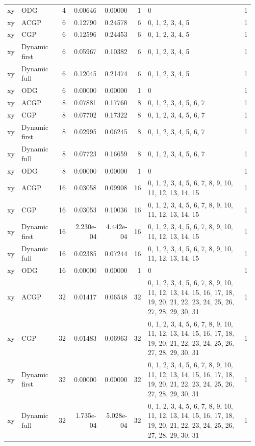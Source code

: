 \documentclass[10pt,a4paper]{article}
\begin{document}
\begin{longtable}{@{}p{23mm}p{29mm}rrrrp{36mm}r@{}}
xy & ODG & 4 & 0.00646 & 0.00000 & 1 & 0 & 1 \\
xy & ACGP & 6 & 0.12790 & 0.24578 & 6 & 0, 1, 2, 3, 4, 5 & 1 \\
xy & CGP & 6 & 0.12596 & 0.24453 & 6 & 0, 1, 2, 3, 4, 5 & 1 \\
xy & Dynamic first & 6 & 0.05967 & 0.10382 & 6 & 0, 1, 2, 3, 4, 5 & 1 \\
xy & Dynamic full & 6 & 0.12045 & 0.21474 & 6 & 0, 1, 2, 3, 4, 5 & 1 \\
xy & ODG & 6 & 0.00000 & 0.00000 & 1 & 0 & 1 \\
xy & ACGP & 8 & 0.07881 & 0.17760 & 8 & 0, 1, 2, 3, 4, 5, 6, 7 & 1 \\
xy & CGP & 8 & 0.07702 & 0.17322 & 8 & 0, 1, 2, 3, 4, 5, 6, 7 & 1 \\
xy & Dynamic first & 8 & 0.02995 & 0.06245 & 8 & 0, 1, 2, 3, 4, 5, 6, 7 & 1 \\
xy & Dynamic full & 8 & 0.07723 & 0.16659 & 8 & 0, 1, 2, 3, 4, 5, 6, 7 & 1 \\
xy & ODG & 8 & 0.00000 & 0.00000 & 1 & 0 & 1 \\
xy & ACGP & 16 & 0.03058 & 0.09908 & 16 & 0, 1, 2, 3, 4, 5, 6, 7, 8, 9, 10, 11, 12, 13, 14, 15 & 1 \\
xy & CGP & 16 & 0.03053 & 0.10036 & 16 & 0, 1, 2, 3, 4, 5, 6, 7, 8, 9, 10, 11, 12, 13, 14, 15 & 1 \\
xy & Dynamic first & 16 & 2.230e-04 & 4.442e-04 & 16 & 0, 1, 2, 3, 4, 5, 6, 7, 8, 9, 10, 11, 12, 13, 14, 15 & 1 \\
xy & Dynamic full & 16 & 0.02385 & 0.07244 & 16 & 0, 1, 2, 3, 4, 5, 6, 7, 8, 9, 10, 11, 12, 13, 14, 15 & 1 \\
xy & ODG & 16 & 0.00000 & 0.00000 & 1 & 0 & 1 \\
xy & ACGP & 32 & 0.01417 & 0.06548 & 32 & 0, 1, 2, 3, 4, 5, 6, 7, 8, 9, 10, 11, 12, 13, 14, 15, 16, 17, 18, 19, 20, 21, 22, 23, 24, 25, 26, 27, 28, 29, 30, 31 & 1 \\
xy & CGP & 32 & 0.01483 & 0.06963 & 32 & 0, 1, 2, 3, 4, 5, 6, 7, 8, 9, 10, 11, 12, 13, 14, 15, 16, 17, 18, 19, 20, 21, 22, 23, 24, 25, 26, 27, 28, 29, 30, 31 & 1 \\
xy & Dynamic first & 32 & 0.00000 & 0.00000 & 32 & 0, 1, 2, 3, 4, 5, 6, 7, 8, 9, 10, 11, 12, 13, 14, 15, 16, 17, 18, 19, 20, 21, 22, 23, 24, 25, 26, 27, 28, 29, 30, 31 & 1 \\
xy & Dynamic full & 32 & 1.735e-04 & 5.028e-04 & 32 & 0, 1, 2, 3, 4, 5, 6, 7, 8, 9, 10, 11, 12, 13, 14, 15, 16, 17, 18, 19, 20, 21, 22, 23, 24, 25, 26, 27, 28, 29, 30, 31 & 1 \\

\end{longtable}
\end{document}
